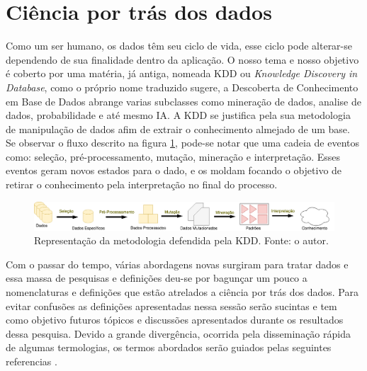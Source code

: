 \section{Ciência por trás dos dados}
Como um ser humano, os dados têm seu ciclo de vida, esse ciclo pode alterar-se dependendo de sua finalidade dentro da aplicação. O nosso tema e nosso objetivo é coberto por uma matéria, já antiga, nomeada KDD ou \textit{Knowledge Discovery in Database}, como o próprio nome traduzido sugere, a Descoberta de Conhecimento em Base de Dados abrange varias subclasses como mineração de dados, analise de dados, probabilidade e até mesmo IA. A KDD se justifica pela sua metodologia de manipulação de dados afim de extrair o conhecimento almejado de um base. Se observar o fluxo descrito na figura \ref{fig:kdd}, pode-se notar que uma cadeia de eventos como: seleção, pré-processamento, mutação, mineração e interpretação. Esses eventos geram novos estados para o dado, e os moldam focando o objetivo de retirar o conhecimento pela interpretação no final do processo.

\begin{figure}[H]
    \centering
    \includegraphics[width=.8\textwidth]{imagens/kdd.png}
    \caption{Representação da metodologia defendida pela KDD. Fonte: o autor.}
    \label{fig:kdd}
\end{figure}

Com o passar do tempo, várias abordagens novas surgiram para tratar dados e essa massa de pesquisas e definições deu-se por bagunçar um pouco a nomenclaturas e definições que estão atrelados a ciência por trás dos dados. Para evitar confusões as definições apresentadas nessa sessão serão sucintas e tem como objetivo futuros tópicos e discussões apresentados durante os resultados dessa pesquisa. Devido a grande divergência, ocorrida pela disseminação rápida de algumas termologias, os termos abordados serão guiados pelas seguintes referencias \cite{laender2002brief, fayyad1996kdd, hand2007principles}.





